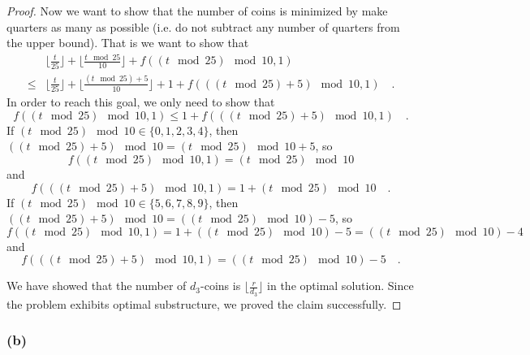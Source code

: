 \begin{proof}
    Now we want to show that the number of coins is minimized by make quarters as many as possible 
    (i.e. do not subtract any number of quarters from the upper bound).
    That is we want to show that 
    \begin{equation*}
    \begin{split}
        & \lfloor \frac{t}{25} \rfloor
        + \lfloor \frac{t \mod 25}{10} \rfloor 
        + f((t \mod 25) \mod 10, 1) \\
        \leq 
        & \lfloor \frac{t}{25} \rfloor 
        + \lfloor \frac{(t \mod 25) + 5}{10} \rfloor + 1 
        + f(((t \mod 25) + 5) \mod 10, 1) 
        \quad .
    \end{split}
    \end{equation*}
    In order to reach this goal, we only need to show that 
    \begin{equation*}
        f((t \mod 25) \mod 10, 1) \leq 1 + f(((t \mod 25) + 5) \mod 10, 1) 
        \quad .
    \end{equation*}
    If $(t \mod 25) \mod 10 \in \{ 0, 1, 2, 3, 4 \}$, 
    then $((t \mod 25) + 5) \mod 10 = (t \mod 25) \mod 10 + 5$, 
    so 
    \begin{equation*}
        f((t \mod 25) \mod 10, 1) = (t \mod 25) \mod 10
    \end{equation*}
    and 
    \begin{equation*}
        f(((t \mod 25) + 5) \mod 10, 1) = 1 + (t \mod 25) \mod 10
        \quad .
    \end{equation*}
    If $(t \mod 25) \mod 10 \in \{ 5, 6, 7, 8, 9 \}$, 
    then $((t \mod 25) + 5) \mod 10 = ((t \mod 25) \mod 10) - 5$, 
    so 
    \begin{equation*}
        f((t \mod 25) \mod 10, 1) = 1 + ((t \mod 25) \mod 10) - 5 = ((t \mod 25) \mod 10) - 4
    \end{equation*}
    and 
    \begin{equation*}
        f(((t \mod 25) + 5) \mod 10, 1) = ((t \mod 25) \mod 10) - 5
        \quad .
    \end{equation*}

    We have showed that the number of $d_3$-coins is 
    $\lfloor \frac{r}{d_3} \rfloor$ in the optimal solution.
    Since the problem exhibits optimal substructure, 
    we proved the claim successfully.
\end{proof}

\subsubsection*{(b)}

